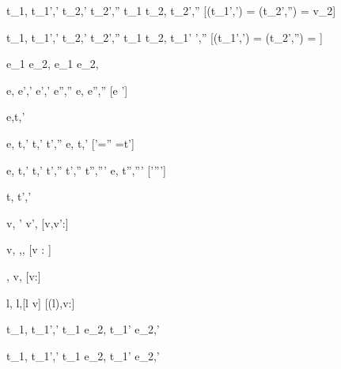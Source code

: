   {t_1,{\sigma}  {\stride} {t_1}',{\sigma}'  \Quad
   t_2,{\sigma}' {\stride} {t_2}',{\sigma}''}
  {t_1 \Or t_2,{\sigma} {\stride} {t_2}',{\sigma}''}
  [\Value({t_1}',{\sigma}') = \bot \land \Value({t_2}',{\sigma}'') = {v_2}]

  {t_1,{\sigma}  {\stride }{t_1}',{\sigma}'  \Quad
   t_2,{\sigma' }{\stride} {t_2}',{\sigma}''}
  {t_1 \Or t_2,{\sigma} {\stride} {t_1}' ',{\sigma}''}
  [\Value({t_1}',{\sigma}') = \bot \land \Value({t_2}',{\sigma}'') = \bot]


  { }
  {e_1 \Xor e_2,{\sigma} {\stride} e_1 \Xor e_2,{\sigma}}

    {e,{\sigma} {\eval} {e}',{\sigma}'  \Quad
     e',{\sigma}' {\stride} {e}'',{\sigma}''}
    {e,{\sigma} {\stride} {e}'',{\sigma}''}
    [e ']



  {e,\sigma \normalise t,\sigma'}


    {e,{\sigma} {\eval} {t},{\sigma}' \Quad
     {t},{\sigma}' {\stride} {t}',{\sigma}''}
    {e,{\sigma} {\normalise} {t},{\sigma}'}
    [{\sigma}'={\sigma}'' ={t}']

    {e,{\sigma} {\eval} {t},{\sigma}'  \Quad
     {t},{\sigma}' {\stride} {t}',{\sigma}''  \Quad
     {t}',{\sigma}'' {\normalise} {t}'',{\sigma}'''}
    {e,{\sigma} {\normalise} {t}'',{\sigma}'''}
    [{\sigma}'\neq {\sigma}''']




  {t,\sigma {} t',\sigma'}


  { }
  {\Edit v,{\sigma} ' \Edit v',{\sigma}}
  [v,v':\tau]

  { }
  {\Edit v,\sigma \handle{\Empty} \Enter \tau,\sigma,\True}
  [v : \tau]

  { }
  {\Enter \tau,{\sigma}  \Edit v,{\sigma}}
  [v:\tau]

  { }
  {\Update l,{\sigma}  \Update l,{\sigma}[l \mapsto v]}
  [\sigma(l),v:\tau]

  {t_1,\sigma {} {t_1'},\sigma'}
  {t_1 \Then e_2,\sigma {} {t_1'} \Then e_2,\sigma'}

  {t_1,\sigma {} {t_1'},\sigma'}
  {t_1 \Next e_2,\sigma {} {t_1'} \Next e_2,\sigma'}

